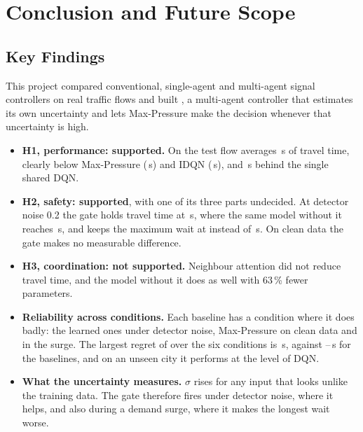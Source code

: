 \chapter{Conclusion and Future Scope}
\label{ch:conclusion}

\section{Key Findings}

This project compared conventional, single-agent and multi-agent signal controllers on real
traffic flows and built \ugmarl{}, a multi-agent controller that estimates its own uncertainty and
lets Max-Pressure make the decision whenever that uncertainty is high.
\begin{itemize}
\item \textbf{H1, performance: supported.} On the test flow \ugmarl{} averages
\,s of travel time, clearly below Max-Pressure
(\,s) and IDQN (\,s), and
\,s behind the single shared DQN.
\item \textbf{H2, safety: supported}, with one of its three parts undecided. At detector
noise 0.2 the gate holds travel time at \,s, where the same model
without it reaches \,s, and keeps the maximum wait at
 instead of \,s. On clean data
the gate makes no measurable difference.
\item \textbf{H3, coordination: not supported.} Neighbour attention did not reduce travel
time, and the model without it does as well with 63\,\% fewer parameters.
\item \textbf{Reliability across conditions.} Each baseline has a condition where it does
badly: the learned ones under detector noise, Max-Pressure on clean data and in the surge.
The largest regret of \ugmarl{} over the six conditions is \,s,
against --\,s for the baselines, and
on an unseen city it performs at the level of DQN.
\item \textbf{What the uncertainty measures.} $\sigma$ rises for any input that looks unlike
the training data. The gate therefore fires under detector noise, where it helps, and also
during a demand surge, where it makes the longest wait worse.
\end{itemize}

